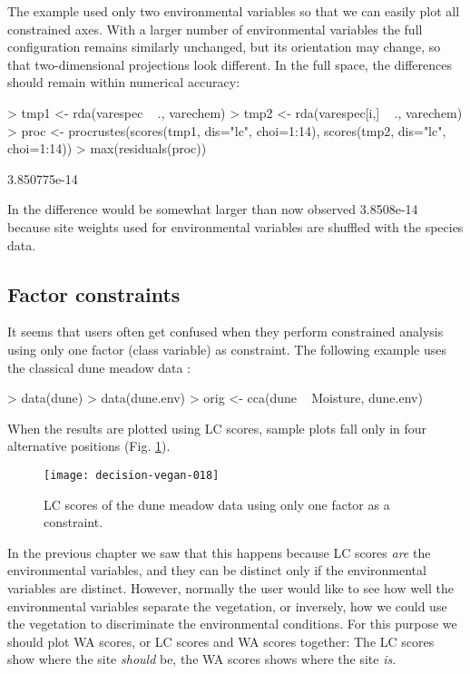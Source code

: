 \documentclass[a4paper,10pt,twocolumn]{article}
\begin{document}
The example used only two environmental variables so that we can
easily plot all constrained axes.  With a larger number of
environmental variables the full configuration remains similarly
unchanged, but its orientation may change, so that two-dimensional
projections look different.  In the full space, the differences should
remain within numerical accuracy:
\begin{Schunk}
\begin{Sinput}
> tmp1 <- rda(varespec ~ ., varechem)
> tmp2 <- rda(varespec[i,] ~ ., varechem)
> proc <- procrustes(scores(tmp1, dis="lc", choi=1:14), 
                     scores(tmp2, dis="lc", choi=1:14))
> max(residuals(proc))
\end{Sinput}
\begin{Soutput}
[1] 3.850775e-14
\end{Soutput}
\end{Schunk}
In  the difference would be somewhat larger than now
observed 3.8508e-14 because site
weights used for environmental variables are shuffled with the species
data.

\subsection{Factor constraints}

It seems that users often get confused when they perform constrained
analysis using  only one factor (class variable) as constraint.  The
following example uses the classical dune meadow data \cite{Jongman87}:
\begin{Schunk}
\begin{Sinput}
> data(dune)
> data(dune.env)
> orig <- cca(dune ~ Moisture, dune.env)
\end{Sinput}
\end{Schunk}
When the results are plotted using LC scores, sample plots fall only
in four alternative positions (Fig. \ref{fig:factorlc}).
\begin{figure}
\texttt{[image: decision-vegan-018]}
\caption{LC scores of the dune meadow data using only one factor as a
  constraint.}
\label{fig:factorlc}
\end{figure}
In the previous chapter we saw that this happens because LC scores
\emph{are} the environmental variables, and they can be distinct only
if the environmental variables are distinct.  However, normally the user
would like to see how well the environmental variables separate the
vegetation, or inversely, how we could use the vegetation to
discriminate the environmental conditions.  For this purpose we should
plot WA scores, or LC scores and WA scores together:  The LC scores
show where the site \emph{should} be, the WA scores shows where the
site \emph{is}.
\end{document}
